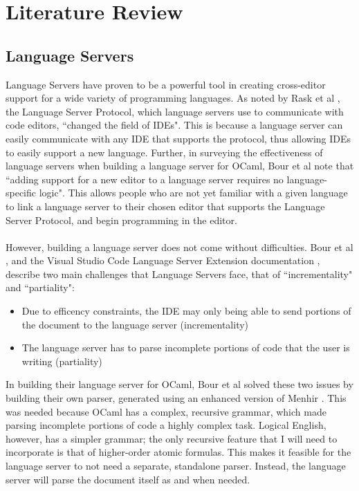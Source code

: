 \documentclass[../main.tex]{subfiles}
\begin{document}
\chapter{Literature Review}
\section{Language Servers}
\label{section:lit-review-servers}
Language Servers have proven to be a powerful tool in creating cross-editor support for a wide variety of programming languages. As noted by Rask et al \cite[]{standardised_lsp_extensions}, the Language Server Protocol, which language servers use to communicate with code editors, ``changed the field of IDEs". This is because a language server can easily communicate with any IDE that supports the protocol, thus allowing IDEs to easily support a new language. Further, in surveying the effectiveness of language servers when building a language server for OCaml, Bour et al \cite[]{merlin_experience_report} note that ``adding support for a new editor to a language server requires no language-specific logic". This allows people who are not yet familiar with a given language to link a language server to their chosen editor that supports the Language Server Protocol, and begin programming in the editor. 
\\ \\
However, building a language server does not come without difficulties. Bour et al \cite[]{merlin_experience_report}, and the Visual Studio Code Language Server Extension documentation \cite[]{vsc_langserver_docs}, describe two main challenges that Language Servers face, that of ``incrementality" and ``partiality":
\begin{itemize}
    \item Due to efficency constraints, the IDE may only being able to send portions of the document to the language server (incrementality)
    \item The language server has to parse incomplete portions of code that the user is writing (partiality)
\end{itemize}
In building their language server for OCaml, Bour et al solved these two issues by building their own parser, generated using an enhanced version of Menhir \cite{mehir}. This was needed because OCaml has a complex, recursive grammar, which made parsing incomplete portions of code a highly complex task. Logical English, however, has a simpler grammar; the only recursive feature that I will need to incorporate is that of higher-order atomic formulas. This makes it feasible for the language server to not need a separate, standalone parser. Instead, the language server will parse the document itself as and when needed.
\end{document}
